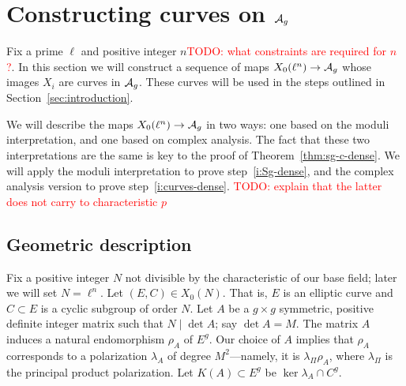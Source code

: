 \documentclass{amsart}
\begin{document}
\section{Constructing curves on $\mathcal{A}_g$}
\label{sec:curves-on-Ag}

Fix a prime $\ell$ and positive integer $n$\textcolor{red}{TODO: what constraints are required for $n$?}. In this section we will construct a sequence of maps $X_0(\ell^n) \to \mathcal{A}_g$ whose images $X_i$ are curves in $\mathcal{A}_g$. These curves will be used in the steps outlined in Section~\ref{sec:introduction}.

We will describe the maps $X_0(\ell^n) \to \mathcal{A}_g$ in two ways: one based on the moduli interpretation, and one based on complex analysis. The fact that these two interpretations are the same is key to the proof of Theorem~\ref{thm:sg-c-dense}. We will apply the moduli interpretation to prove step~\ref{i:Sg-dense}, and the complex analysis version to prove step~\ref{i:curves-dense}. \textcolor{red}{TODO: explain that the latter does not carry to characteristic $p$}

\subsection{Geometric description}
\label{sec:geo-desc}


Fix a positive integer $N$ not divisible by the characteristic of our base field; later we will set $N = \ell^n$. Let $(E, C) \in X_0(N)$. That is, $E$ is an elliptic curve and $C \subset E$ is a cyclic subgroup of order $N$. Let $A$ be a $g \times g$ symmetric, positive definite integer matrix such that $N \mid \det A$; say $\det A = M$. The matrix $A$ induces a natural endomorphism $\rho_A$ of $E^g$. Our choice of $A$ implies that $\rho_A$ corresponds to a polarization $\lambda_A$ of degree $M^2$---namely, it is $\lambda_{\Pi}\rho_A$, where $\lambda_\Pi$ is the principal product polarization. Let $K(A) \subset E^g$ be $\ker \lambda_A \cap C^g$.
\end{document}
